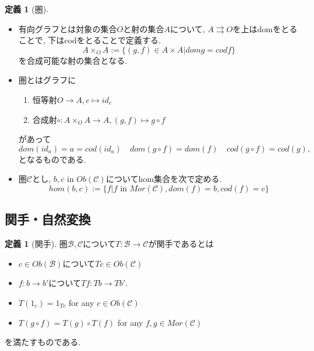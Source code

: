 \documentclass[dvipdfmx,a4paper,11pt]{report}
\theoremstyle{definition}
\newtheorem{dfn}[thm]{定義}
\begin{document}
 \begin{tcolorbox}
 [colback = white, colframe = green!35!black, fonttitle = \bfseries,breakable = true]
\begin{dfn}[圏]
\begin{itemize}
\item 有向グラフとは対象の集合$O$と射の集合$A$について, $A \rightrightarrows O$を上はdomをとることで, 下はcodをとることで定義する.
$$
A \times_{O} A := \{ (g,f) \in A \times A| dom g = cod f
\}
$$
を合成可能な射の集合となる.
\item 圏とはグラフに
\begin{enumerate}
\item 恒等射$O \to A, c \mapsto id_c$
\item 合成射$ \circ : A \times_{O} A \to A, (g,f) \mapsto g \circ f$
\end{enumerate}
があって
$$dom(id_a) = a = cod (id_a) \quad 
dom(g \circ f ) = dom (f) \quad cod (g \circ f ) = cod (g), 
$$
となるものである.
\item 圏$\mathcal{C}$とし, $b,c \text{ in } Ob(\mathcal{C})$についてhom集合を次で定める.
$$
hom(b,c) := \{ f | f \text{ in } Mor(\mathcal{C}), dom (f) = b, cod (f) = c\}
$$
\end{itemize}
\end{dfn}
 \end{tcolorbox}
 

\subsection{関手・自然変換}


 \begin{tcolorbox}
 [colback = white, colframe = green!35!black, fonttitle = \bfseries,breakable = true]
\begin{dfn}[関手]
圏$\mathcal{B}, \mathcal{C}$について$T : \mathcal{B} \to\mathcal{C}$が関手であるとは
\begin{itemize}
\item $c \in Ob(\mathcal{B})$について$Tc \in Ob(\mathcal{C})$
\item $f : b \to b'$について$Tf : Tb \to Tb'$.
\item $T(1_{c}) = 1_{Tc}$ for any $c \in Ob(\mathcal{C})$
\item $T(g \circ f) = T(g) \circ T(f)$ for any $f,g \in Mor(\mathcal{C})$
\end{itemize}
を満たすものである.
\end{dfn}
\end{tcolorbox}
\end{document}

